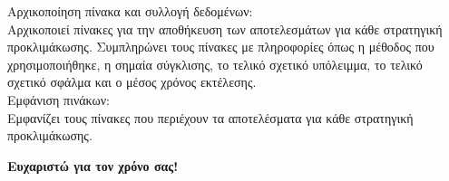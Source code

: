 \documentclass[12pt,a4paper]{article}
\begin{document}
Αρχικοποίηση πίνακα και συλλογή δεδομένων:\\
Αρχικοποιεί πίνακες για την αποθήκευση των αποτελεσμάτων για κάθε στρατηγική προκλιμάκωσης.
Συμπληρώνει τους πίνακες με πληροφορίες όπως η μέθοδος που χρησιμοποιήθηκε, η σημαία σύγκλισης, το τελικό σχετικό υπόλειμμα, το τελικό σχετικό σφάλμα και ο μέσος χρόνος εκτέλεσης.\\

Εμφάνιση πινάκων:\\
Εμφανίζει τους πίνακες που περιέχουν τα αποτελέσματα για κάθε στρατηγική προκλιμάκωσης.\\

\begin{center}
\textbf{Ευχαριστώ για τον χρόνο σας!}
\end{center}

\end{document}
